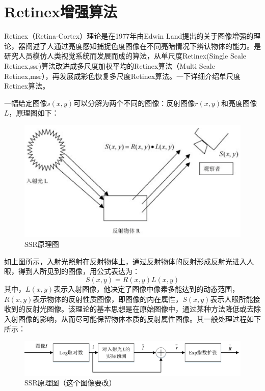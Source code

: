 \documentclass[12pt]{book}
\begin{document}
		\section{Retinex增强算法}	Retinex（Retina-Cortex）理论是在1977年由Edwin Land提出的关于图像增强的理论，器阐述了人通过亮度感知捕捉色度图像在不同亮暗情况下辨认物体的能力。是研究人员模仿人类视觉系统而发展而成的算法，从单尺度Retinex(Single Scale Retinex,ssr)算法改进成多尺度加权平均的Retinex算法（Multi Scale Retinex,msr），再发展成彩色恢复多尺度Retinex算法。一下详细介绍单尺度Retinex算法。

一幅给定图像$s(x,y)$可以分解为两个不同的图像：反射图像$r(x,y)$和亮度图像$L$，原理图如下：
			\begin{figure}[!ht]\centering
				\includegraphics[totalheight=60mm]{./figures/retinexSSR.png}
				\caption{SSR原理图\label{SSR}}
			\end{figure}

如上图所示，入射光照射在反射物体上，通过反射物体的反射形成反射光进入人眼，得到人所见到的图像，用公式表达为：
\begin{equation}     S(x,y)=R(x,y)L(x,y)    \end{equation}	
其中，$L(x,y)$表示入射图像，他决定了图像中像素多能达到的动态范围，$R(x,y)$表示物体的反射性质图像，即图像的内在属性，$S(x,y)$表示人眼所能接收到的反射光图像。该理论的基本思想是在原始图像中，通过某种方法降低或去除入射图像的影响，从而尽可能保留物体本质的反射属性图像。其一般处理过程如下所示：
			\begin{figure}[!ht]\centering
				\includegraphics[totalheight=30mm,width=160mm]{./figures/retinexSSR1.png}
				\caption{SSR原理图（这个图像要改）\label{SSR}}
			\end{figure}
\end{document}
